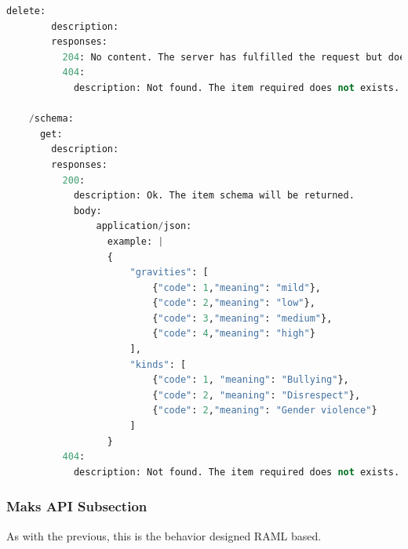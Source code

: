 \begin{lstlisting}[language=python,frame=none]
      delete:
        description:
        responses:
          204: No content. The server has fulfilled the request but does not need to return an entity-body.
          404:
            description: Not found. The item required does not exists.

    /schema:
      get:
        description:
        responses:
          200:
            description: Ok. The item schema will be returned.
            body:
                application/json:
                  example: |
                  {
                      "gravities": [
                          {"code": 1,"meaning": "mild"},
                          {"code": 2,"meaning": "low"},
                          {"code": 3,"meaning": "medium"},
                          {"code": 4,"meaning": "high"}
                      ],
                      "kinds": [
                          {"code": 1, "meaning": "Bullying"},
                          {"code": 2, "meaning": "Disrespect"},
                          {"code": 2,"meaning": "Gender violence"}
                      ]
                  }
          404:
            description: Not found. The item required does not exists.

\end{lstlisting}

\subsubsection{Maks API Subsection}

As with the previous, this is the behavior designed RAML based.

